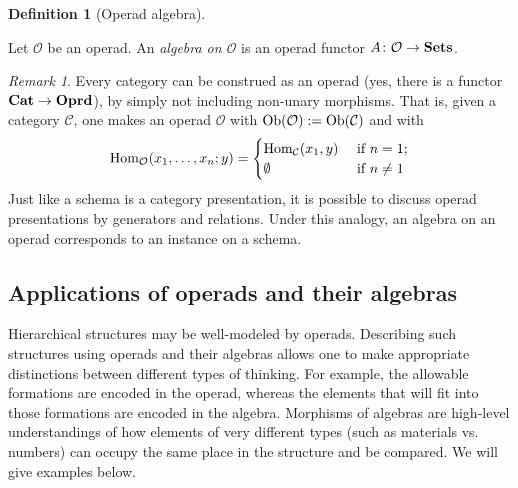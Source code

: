 \documentclass{book}
\def\tn{\textnormal}
\def\mc{\mathcal}
\def\Hom{\tn{Hom}}
\def\Ob{\tn{Ob}}
\def\to{\rightarrow}
\def\taking{\colon}
\def\Cat{{\bf Cat}}
\def\Oprd{{\bf Oprd}}
\def\Sets{{\bf Sets}}
\def\mcC{\mc{C}}
\def\mcO{\mc{O}}
\theoremstyle{remark}
\newtheorem{remark}[subsubsection]{Remark}
\theoremstyle{definition}
\newtheorem{definition}[subsubsection]{Definition}
\begin{document}
\begin{definition}[Operad algebra]\label{def:operad algebra}

Let $\mcO$ be an operad. An {\em algebra on $\mcO$} is an operad functor $A\taking\mcO\to\Sets$.

\end{definition}

\begin{remark}

Every category can be construed as an operad (yes, there is a functor $\Cat\to\Oprd$), by simply not including non-unary morphisms. That is, given a category $\mcC$, one makes an operad $\mcO$ with $\Ob(\mcO):=\Ob(\mcC)$ and with 
$$
\Hom_\mcO(x_1,\ldots,x_n;y)=
\begin{cases}
\Hom_\mcC(x_1,y)&\tn{ if }n=1;\\
\emptyset&\tn{ if }n\neq 1
\end{cases}
$$
Just like a schema is a category presentation, it is possible to discuss operad presentations by generators and relations. Under this analogy, an algebra on an operad corresponds to an instance on a schema.

\end{remark}


\subsection{Applications of operads and their algebras}

Hierarchical structures may be well-modeled by operads. Describing such structures using operads and their algebras allows one to make appropriate distinctions between different types of thinking. For example, the allowable formations are encoded in the operad, whereas the elements that will fit into those formations are encoded in the algebra. Morphisms of algebras are high-level understandings of how elements of very different types (such as materials vs. numbers) can occupy the same place in the structure and be compared. We will give examples below.
\end{document}
